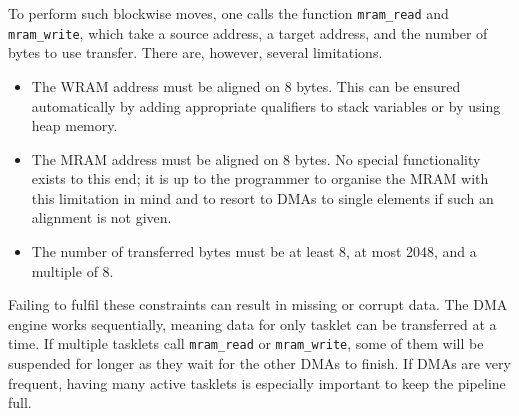 To perform such blockwise moves, one calls the \langC{} function \lstinline|mram_read| and \lstinline|mram_write|, which take a source address, a target address, and the number of bytes to use transfer.
There are, however, several limitations.
\begin{itemize}
	\item
	The \ac{WRAM} address must be aligned on 8 bytes.
	This can be ensured automatically by adding appropriate qualifiers to stack variables or by using heap memory.

	\item
	The \ac{MRAM} address must be aligned on 8 bytes.
	No special functionality exists to this end;
	it is up to the programmer to organise the \ac{MRAM} with this limitation in mind and to resort to \acp{DMA} to single elements if such an alignment is not given.

	\item
	The number of transferred bytes must be at least 8, at most 2048, and a multiple of 8.
\end{itemize}
Failing to fulfil these constraints can result in missing or corrupt data.
The \ac{DMA} engine works sequentially, meaning data for only tasklet can be transferred at a time.
If multiple tasklets call \lstinline|mram_read| or \lstinline|mram_write|, some of them will be suspended for longer as they wait for the other \acp{DMA} to finish.
If \acp{DMA} are very frequent, having many active tasklets is especially important to keep the pipeline full.

